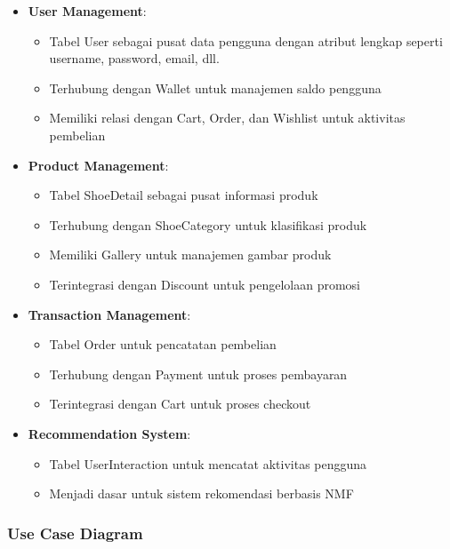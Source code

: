 \documentclass[journal,article,submit,pdftex,moreauthors]{Definitions/mdpi}
\begin{document}
\begin{itemize}
    \item \textbf{User Management}:
    \begin{itemize}
        \item Tabel User sebagai pusat data pengguna dengan atribut lengkap seperti username, password, email, dll.
        \item Terhubung dengan Wallet untuk manajemen saldo pengguna
        \item Memiliki relasi dengan Cart, Order, dan Wishlist untuk aktivitas pembelian
    \end{itemize}
    
    \item \textbf{Product Management}:
    \begin{itemize}
        \item Tabel ShoeDetail sebagai pusat informasi produk
        \item Terhubung dengan ShoeCategory untuk klasifikasi produk
        \item Memiliki Gallery untuk manajemen gambar produk
        \item Terintegrasi dengan Discount untuk pengelolaan promosi
    \end{itemize}
    
    \item \textbf{Transaction Management}:
    \begin{itemize}
        \item Tabel Order untuk pencatatan pembelian
        \item Terhubung dengan Payment untuk proses pembayaran
        \item Terintegrasi dengan Cart untuk proses checkout
    \end{itemize}
    
    \item \textbf{Recommendation System}:
    \begin{itemize}
        \item Tabel UserInteraction untuk mencatat aktivitas pengguna
        \item Menjadi dasar untuk sistem rekomendasi berbasis NMF
    \end{itemize}
\end{itemize}



\subsubsection{Use Case Diagram}
\end{document}
